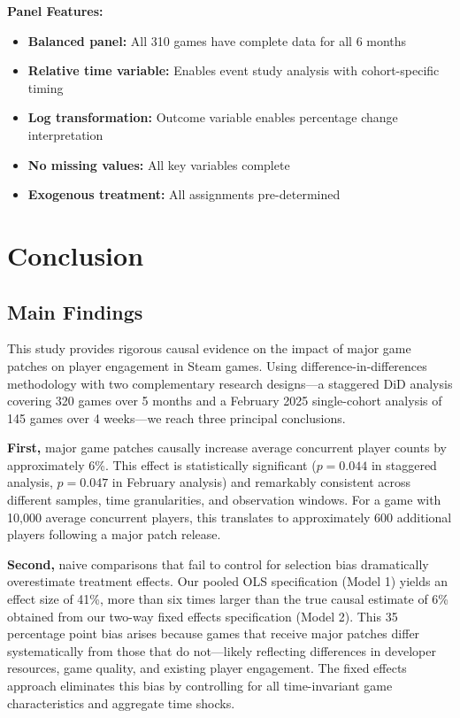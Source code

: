 \documentclass[12pt,a4paper]{article}
\begin{document}
\textbf{Panel Features:}
\begin{itemize}
    \item \textbf{Balanced panel:} All 310 games have complete data for all 6 months
    \item \textbf{Relative time variable:} Enables event study analysis with cohort-specific timing
    \item \textbf{Log transformation:} Outcome variable enables percentage change interpretation
    \item \textbf{No missing values:} All key variables complete
    \item \textbf{Exogenous treatment:} All assignments pre-determined
\end{itemize}


\section{Conclusion}

\subsection{Main Findings}

This study provides rigorous causal evidence on the impact of major game patches on player engagement in Steam games. Using difference-in-differences methodology with two complementary research designs---a staggered DiD analysis covering 320 games over 5 months and a February 2025 single-cohort analysis of 145 games over 4 weeks---we reach three principal conclusions.

\textbf{First,} major game patches causally increase average concurrent player counts by approximately 6\%. This effect is statistically significant ($p=0.044$ in staggered analysis, $p=0.047$ in February analysis) and remarkably consistent across different samples, time granularities, and observation windows. For a game with 10,000 average concurrent players, this translates to approximately 600 additional players following a major patch release.

\textbf{Second,} naive comparisons that fail to control for selection bias dramatically overestimate treatment effects. Our pooled OLS specification (Model 1) yields an effect size of 41\%, more than six times larger than the true causal estimate of 6\% obtained from our two-way fixed effects specification (Model 2). This 35 percentage point bias arises because games that receive major patches differ systematically from those that do not---likely reflecting differences in developer resources, game quality, and existing player engagement. The fixed effects approach eliminates this bias by controlling for all time-invariant game characteristics and aggregate time shocks.
\end{document}
